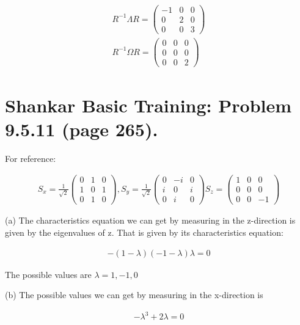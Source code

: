 \documentclass{article}
\begin{document}
\begin{align}
    R^{-1} \Lambda R = \begin{pmatrix}
        -1 & 0 & 0 \\ 0 & 2 & 0 \\ 0 & 0 & 3
    \end{pmatrix} \\
    R^{-1} \Omega R = \begin{pmatrix}
        0 & 0 & 0 \\ 0 & 0 & 0 \\ 0 & 0 & 2
    \end{pmatrix}
\end{align}


\section{Shankar Basic Training: Problem  9.5.11 (page 265).}

For reference:

\begin{align}
    S_x = \frac{1}{\sqrt{2}} \begin{pmatrix}
        0 & 1 & 0 \\ 1 & 0 & 1 \\ 0 & 1 & 0
    \end{pmatrix},
    S_y = \frac{1}{\sqrt{2}} \begin{pmatrix}
        0 & -i & 0 \\ i & 0 & i \\ 0 & i & 0
    \end{pmatrix}
    S_z = \begin{pmatrix}
        1 & 0 & 0 \\ 0 & 0 & 0 \\ 0 & 0 & -1
    \end{pmatrix}
\end{align}

(a) The characteristics equation we can get by measuring in the z-direction is given by the eigenvalues of z. That is given by its characteristics equation: 

\begin{align}
    -(1-\lambda)(-1-\lambda)\lambda = 0 
\end{align}

The possible values are $\lambda = 1, -1, 0$

(b) The possible values we can get by measuring in the x-direction is

\begin{align}
    -\lambda^3 + 2\lambda  = 0 
\end{align}
\end{document}
